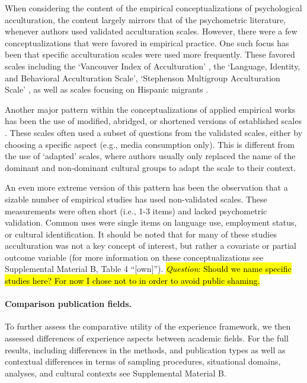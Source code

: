 When considering the content of the empirical conceptualizations of
psychological acculturation, the content largely mirrors that of the
psychometric literature, whenever authors used validated acculturation
scales. However, there were a few conceptualizations that were favored
in empirical practice. One such focus has been that specific
acculturation scales were used more frequently. These favored scales
including the `Vancouver Index of Acculturation' \citep[][]{Ryder2000},
the `Language, Identity, and Behavioral Acculturation Scale',
`Stephenson Multigroup Acculturation Scale' \citep[][]{Stephenson2000},
as well as scales focusing on Hispanic migrants
\citep[][]{Cuellar1995a, Marin1987, Marin1987}.

Another major pattern within the conceptualizations of applied empirical
works has been the use of modified, abridged, or shortened versions of
established scales \citep[e.g.,][]{Green2014,Im2009}. These scales often
used a subset of questions from the validated scales, either by choosing
a specific aspect (e.g., media consumption only). This is different from
the use of `adapted' scales, where authors usually only replaced the
name of the dominant and non-dominant cultural groups to adapt the scale
to their context.

An even more extreme version of this pattern has been the observation
that a sizable number of empirical studies has used non-validated
scales. These measurements were often short (i.e., 1-3 items) and lacked
psychometric validation. Common uses were single items on language use,
employment status, or cultural identification. It should be noted that
for many of these studies acculturation was not a key concept of
interest, but rather a covariate or partial outcome variable (for more
information on these conceptualizations see Supplemental Material B,
Table 4 ``{[}own{]}'').
\hl{\textit{Question}: Should we name specific studies here? For now I chose not to in order to avoid public shaming.}

\color{black}

\paragraph{Comparison publication fields.}

To further assess the comparative utility of the experience framework,
we then assessed differences of experience aspects between academic
fields. For the full results, including differences in the methods, and
publication types as well as contextual differences in terms of sampling
procedures, situational domains, analyses, and cultural contexts see
Supplemental Material B.

